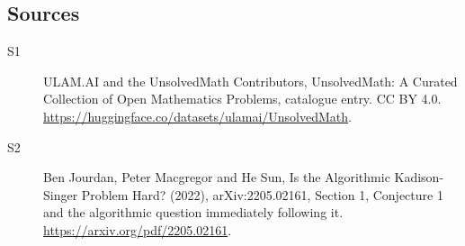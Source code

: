 \documentclass[11pt]{article}
\begin{document}
\subsection{Sources}
\begin{description}
\item[\hypertarget{source:statement:1}{S1}] ULAM.AI and the UnsolvedMath Contributors, UnsolvedMath: A Curated Collection of Open Mathematics Problems, catalogue entry. CC BY 4.0. \url{https://huggingface.co/datasets/ulamai/UnsolvedMath}.
\item[\hypertarget{source:statement:2}{S2}] Ben Jourdan, Peter Macgregor and He Sun, Is the Algorithmic Kadison-Singer Problem Hard? (2022), arXiv:2205.02161, Section 1, Conjecture 1 and the algorithmic question immediately following it. \url{https://arxiv.org/pdf/2205.02161}.
\end{description}
\label{end:statement}
\end{document}
